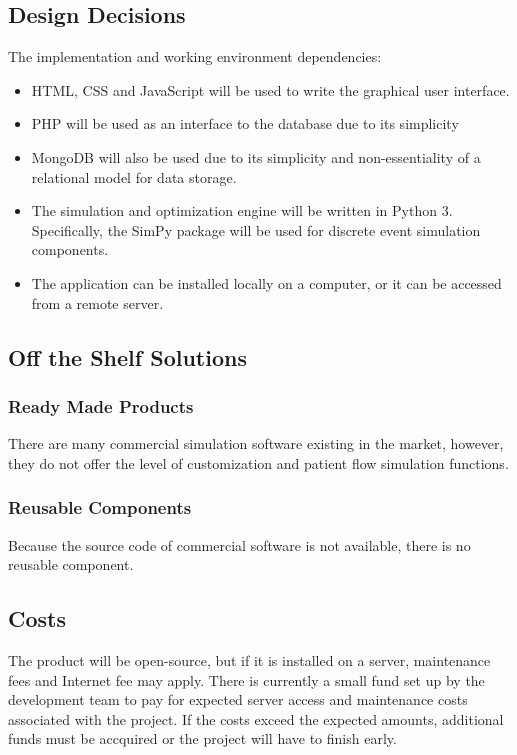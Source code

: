 \documentclass[12pt, titlepage]{article}
\begin{document}
\subsection{Design Decisions}
The implementation and working environment dependencies:
\begin{itemize}
  \item HTML, CSS and JavaScript will be used to write the graphical user interface.
  \item PHP will be used as an interface to the database due to its simplicity
  \item MongoDB will also be used due to its simplicity and non-essentiality of a relational model for data storage. 
  \item The simulation and optimization engine will be written in Python 3. Specifically, the SimPy package will be used for discrete event simulation components.
  \item The application can be installed locally on a computer, or it can be  
  	accessed from a remote server.
\end{itemize}

\subsection{Off the Shelf Solutions}
\subsubsection{Ready Made Products}
There are many commercial simulation software existing in the market, however, they do not offer the level of customization and patient flow simulation functions.

\subsubsection{Reusable Components}
Because the source code of commercial software is not available, there is no reusable component.

\subsection{Costs}
The product will be open-source, but if it is installed on a server, maintenance fees and Internet fee may apply. There is currently a small fund set up by the development team to pay for expected server access and maintenance costs associated with the project. If the costs exceed the expected amounts, additional funds must be accquired or the project will have to finish early.
\end{document}
